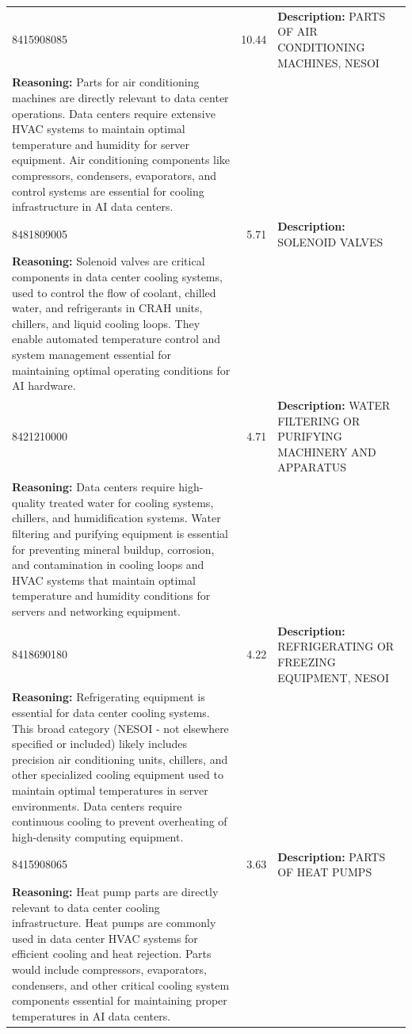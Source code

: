 \begin{longtable}{lrp{12cm}}
8415908085 & 10.44 & \textbf{Description:} PARTS OF AIR CONDITIONING MACHINES, NESOI \\[0.5em] \textbf{Reasoning:} Parts for air conditioning machines are directly relevant to data center operations. Data centers require extensive HVAC systems to maintain optimal temperature and humidity for server equipment. Air conditioning components like compressors, condensers, evaporators, and control systems are essential for cooling infrastructure in AI data centers. \\
\midrule
8481809005 & 5.71 & \textbf{Description:} SOLENOID VALVES \\[0.5em] \textbf{Reasoning:} Solenoid valves are critical components in data center cooling systems, used to control the flow of coolant, chilled water, and refrigerants in CRAH units, chillers, and liquid cooling loops. They enable automated temperature control and system management essential for maintaining optimal operating conditions for AI hardware. \\
\midrule
8421210000 & 4.71 & \textbf{Description:} WATER FILTERING OR PURIFYING MACHINERY AND APPARATUS \\[0.5em] \textbf{Reasoning:} Data centers require high-quality treated water for cooling systems, chillers, and humidification systems. Water filtering and purifying equipment is essential for preventing mineral buildup, corrosion, and contamination in cooling loops and HVAC systems that maintain optimal temperature and humidity conditions for servers and networking equipment. \\
\midrule
8418690180 & 4.22 & \textbf{Description:} REFRIGERATING OR FREEZING EQUIPMENT, NESOI \\[0.5em] \textbf{Reasoning:} Refrigerating equipment is essential for data center cooling systems. This broad category (NESOI - not elsewhere specified or included) likely includes precision air conditioning units, chillers, and other specialized cooling equipment used to maintain optimal temperatures in server environments. Data centers require continuous cooling to prevent overheating of high-density computing equipment. \\
\midrule
8415908065 & 3.63 & \textbf{Description:} PARTS OF HEAT PUMPS \\[0.5em] \textbf{Reasoning:} Heat pump parts are directly relevant to data center cooling infrastructure. Heat pumps are commonly used in data center HVAC systems for efficient cooling and heat rejection. Parts would include compressors, evaporators, condensers, and other critical cooling system components essential for maintaining proper temperatures in AI data centers. \\
\end{longtable}

\clearpage

